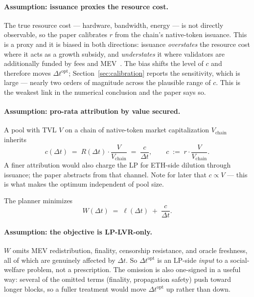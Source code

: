 \documentclass[11pt]{article}
\theoremstyle{definition}
\theoremstyle{remark}
\newcommand{\dt}{\Delta t}
\newcommand{\1}{\mathbf{1}}
\begin{document}
\paragraph{Assumption: issuance proxies the resource cost.} The true resource cost --- hardware, bandwidth, energy --- is not directly observable, so the paper calibrates $r$ from the chain's native-token issuance. This is a proxy and it is biased in both directions: issuance \emph{overstates} the resource cost where it acts as a growth subsidy, and \emph{understates} it where validators are additionally funded by fees and MEV~\cite{buterin2022paths,beccuti2025staking}. The bias shifts the level of $c$ and therefore moves $\dt^{\mathrm{opt}}$; Section~\ref{sec:calibration} reports the sensitivity, which is large --- nearly two orders of magnitude across the plausible range of $c$. This is the weakest link in the numerical conclusion and the paper says so.

\paragraph{Assumption: pro-rata attribution by value secured.} A pool with TVL $V$ on a chain of native-token market capitalization $V_{\mathrm{chain}}$ inherits
\[
c(\dt) \;=\; R(\dt)\cdot\frac{V}{V_{\mathrm{chain}}} \;=\; \frac{c}{\dt},
\qquad c \;:=\; r\cdot\frac{V}{V_{\mathrm{chain}}} .
\]
A finer attribution would also charge the LP for ETH-side dilution through issuance; the paper abstracts from that channel. Note for later that $c \propto V$ --- this is what makes the optimum independent of pool size.

The planner minimizes
\begin{equation}\label{eq:W}
W(\dt) \;=\; \ell(\dt) \;+\; \frac{c}{\dt}.
\end{equation}

\paragraph{Assumption: the objective is LP-LVR-only.} $W$ omits MEV redistribution, finality, censorship resistance, and oracle freshness, all of which are genuinely affected by $\dt$. So $\dt^{\mathrm{opt}}$ is an LP-side \emph{input} to a social-welfare problem, not a prescription. The omission is also one-signed in a useful way: several of the omitted terms (finality, propagation safety) push toward longer blocks, so a fuller treatment would move $\dt^{\mathrm{opt}}$ up rather than down.
\end{document}
